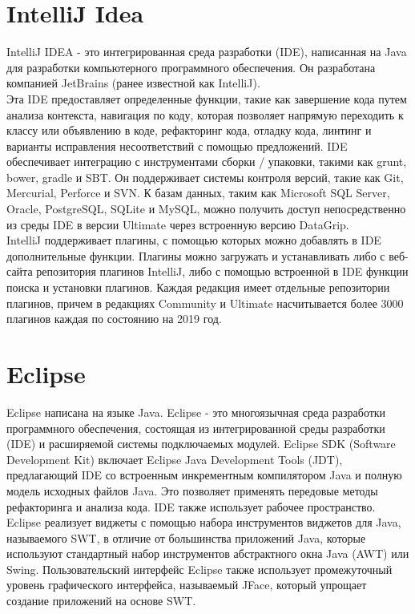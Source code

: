 \section{IntelliJ Idea}
IntelliJ IDEA - это интегрированная среда разработки (IDE), написанная на Java для разработки 
компьютерного программного обеспечения. Он разработана компанией JetBrains (ранее известной как 
IntelliJ).\\

Эта IDE предоставляет определенные функции, такие как завершение кода путем анализа контекста, 
навигация по коду, которая позволяет напрямую переходить к классу или объявлению в коде, 
рефакторинг кода, отладку кода, линтинг и варианты исправления несоответствий с помощью предложений.
IDE обеспечивает интеграцию с инструментами сборки / упаковки, такими как grunt, bower, gradle и 
SBT. Он поддерживает системы контроля версий, такие как Git, Mercurial, Perforce и SVN. К базам 
данных, таким как Microsoft SQL Server, Oracle, PostgreSQL, SQLite и MySQL, можно получить доступ
непосредственно из среды IDE в версии Ultimate через встроенную версию DataGrip.\\

IntelliJ поддерживает плагины, с помощью которых можно добавлять в IDE дополнительные функции. 
Плагины можно загружать и устанавливать либо с веб-сайта репозитория плагинов IntelliJ, либо с 
помощью встроенной в IDE функции поиска и установки плагинов. Каждая редакция имеет отдельные 
репозитории плагинов, причем в редакциях Community и Ultimate насчитывается более 3000 плагинов 
каждая по состоянию на 2019 год.\\

\section{Eclipse}
Eclipse написана на языке Java. Eclipse - это многоязычная среда разработки программного 
обеспечения, состоящая из интегрированной среды разработки (IDE) и расширяемой системы подключаемых
модулей. Eclipse SDK (Software Development Kit) включает Eclipse Java Development Tools (JDT), 
предлагающий IDE со встроенным инкрементным компилятором Java и полную модель исходных файлов Java. 
Это позволяет применять передовые методы рефакторинга и анализа кода. IDE также использует рабочее
пространство. Eclipse реализует виджеты с помощью набора инструментов виджетов для Java, называемого 
SWT, в отличие от большинства приложений Java, которые используют стандартный набор инструментов
абстрактного окна Java (AWT) или Swing. Пользовательский интерфейс Eclipse также использует 
промежуточный уровень графического интерфейса, называемый JFace, который упрощает создание 
приложений на основе SWT.\\

